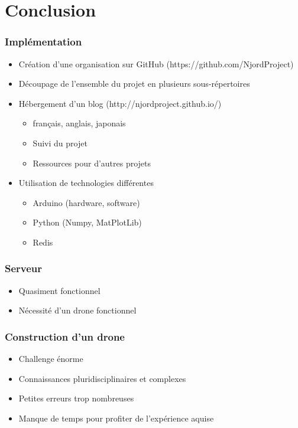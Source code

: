\documentclass{beamer}
\begin{document}
  {
    \section{Conclusion}
    
      \begin{frame}
	\tableofcontents[hideothersubsections]
      \end{frame}
    
      \begin{frame}
	\frametitle{Implémentation}
      
	\begin{itemize}
	  \item Création d'une organisation sur GitHub (https://github.com/NjordProject)
	  \item Découpage de l'ensemble du projet en plusieurs sous-répertoires
	  \item Hébergement d'un blog (http://njordproject.github.io/)
	  \begin{itemize}
	    \item français, anglais, japonais
	    \item Suivi du projet
	    \item Ressources pour d'autres projets
	  \end{itemize}
	  \item Utilisation de technologies différentes
	  \begin{itemize}
	    \item Arduino (hardware, software)
	    \item Python (Numpy, MatPlotLib)
	    \item Redis
	  \end{itemize}
	\end{itemize}
      \end{frame}
      
      \begin{frame}
	\frametitle{Serveur}
	
	\begin{itemize}
	  \item Quasiment fonctionnel
	  \item Nécessité d'un drone fonctionnel
	\end{itemize}
      \end{frame}

      \begin{frame}
	\frametitle{Construction d'un drone}
	
	\begin{itemize}
	  \item Challenge énorme
	  \item Connaissances pluridisciplinaires et complexes
	  \item Petites erreurs trop nombreuses
	  \item Manque de temps pour profiter de l'expérience aquise
	\end{itemize}
      \end{frame}
      
}
\end{document}
